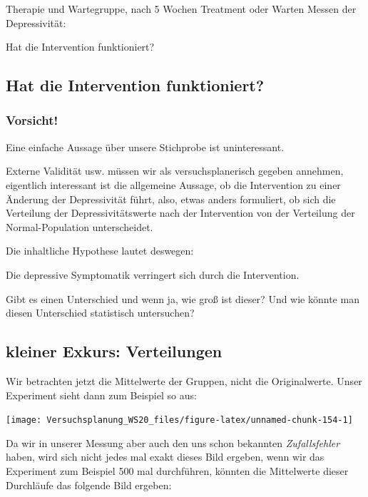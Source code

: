 \documentclass[
]{book}
\begin{document}
Therapie und Wartegruppe, nach 5 Wochen Treatment oder Warten Messen der Depressivität:

Hat die Intervention funktioniert?

\hypertarget{hat-die-intervention-funktioniert}{%
\subsection{Hat die Intervention funktioniert?}\label{hat-die-intervention-funktioniert}}

\hypertarget{vorsicht-1}{%
\subsubsection{Vorsicht!}\label{vorsicht-1}}

Eine einfache Aussage über unsere Stichprobe ist uninteressant.

Externe Validität usw. müssen wir als versuchsplanerisch gegeben annehmen, eigentlich interessant ist die allgemeine Aussage, ob die Intervention zu einer Änderung der Depressivität führt, also, etwas anders formuliert, ob sich die Verteilung der Depressivitätswerte nach der Intervention von der Verteilung der Normal-Population unterscheidet.

Die inhaltliche Hypothese lautet deswegen:

Die depressive Symptomatik verringert sich durch die Intervention.

Gibt es einen Unterschied und wenn ja, wie groß ist dieser?
Und wie könnte man diesen Unterschied statistisch untersuchen?

\hypertarget{kleiner-exkurs-verteilungen}{%
\subsection{kleiner Exkurs: Verteilungen}\label{kleiner-exkurs-verteilungen}}

Wir betrachten jetzt die Mittelwerte der Gruppen, nicht die Originalwerte. Unser Experiment sieht dann zum Beispiel so aus:

\begin{center}\texttt{[image: Versuchsplanung\_WS20\_files/figure-latex/unnamed-chunk-154-1]} \end{center}

Da wir in unserer Messung aber auch den uns schon bekannten \emph{Zufallsfehler} haben, wird sich nicht jedes mal exakt dieses Bild ergeben, wenn wir das Experiment zum Beispiel 500 mal durchführen, könnten die Mittelwerte dieser Durchläufe das folgende Bild ergeben:
\end{document}
